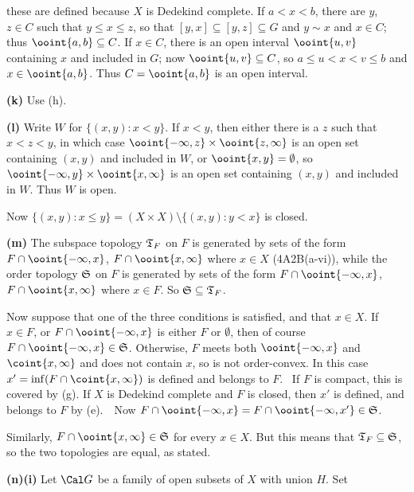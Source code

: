 {\noindent these are defined because $X$ is Dedekind complete.   If
$a<x<b$, there are $y$, $z\in C$ such that $y\le x\le z$, so that
$[y,x]\subseteq[y,z]\subseteq G$ and $y\sim x$ and $x\in C$;  thus
$\ooint{a,b}\subseteq C$.   If $x\in C$, there is an open interval
$\ooint{u,v}$ containing $x$ and included in $G$;  now
$\ooint{u,v}\subseteq C$, so $a\le u<x<v\le b$
and $x\in\ooint{a,b}$.   Thus $C=\ooint{a,b}$ is an open interval.\
\Qed

\medskip

{\bf (k)} Use (h).

\medskip

{\bf (l)} Write $W$ for $\{(x,y):x<y\}$.   If $x<y$, then either there
is a $z$ such that $x<z<y$, in which case
$\ooint{-\infty,z}\times\ooint{z,\infty}$ is an open set containing
$(x,y)$ and included in $W$, or $\ooint{x,y}=\emptyset$,
so $\ooint{-\infty,y}\times\ooint{x,\infty}$ is an open set containing
$(x,y)$ and included in $W$.   Thus $W$ is open.

Now $\{(x,y):x\le y\}=(X\times X)\setminus\{(x,y):y<x\}$ is closed.

\medskip

{\bf (m)} The subspace topology $\frak T_F$ on $F$ is generated by sets
of the form $F\cap\ooint{-\infty,x}$, $F\cap\ooint{x,\infty}$ where
$x\in X$ (4A2B(a-vi)), while the order topology $\frak S$ on $F$ is
generated by sets of the form $F\cap\ooint{-\infty,x}$,
$F\cap\ooint{x,\infty}$ where $x\in F$.   So
$\frak S\subseteq\frak T_F$.

Now suppose that one of the three conditions is satisfied, and that
$x\in X$.   If $x\in F$, or $F\cap\ooint{-\infty,x}$ is either $F$ or
$\emptyset$, then of course
$F\cap\ooint{-\infty,x}\in\frak S$.   Otherwise, $F$ meets both
$\ooint{-\infty,x}$ and $\coint{x,\infty}$ and does not contain $x$, so
is not order-convex.   In this case
$x'=\inf(F\cap\coint{x,\infty})$ is defined and belongs to $F$.   \Prf\
If $F$ is compact, this is covered by (g).   If $X$ is Dedekind complete
and $F$ is closed, then $x'$ is defined, and belongs to $F$ by (e).\
\QeD\   Now $F\cap\ooint{-\infty,x}=F\cap\ooint{-\infty,x'}\in\frak S$.

Similarly, $F\cap\ooint{x,\infty}\in\frak S$ for every $x\in X$.   But
this means that $\frak T_F\subseteq\frak S$, so the two topologies are
equal, as stated.

\medskip

{\bf (n)(i)} Let $\Cal G$ be a family of open subsets of $X$ with
union $H$.   Set

}
